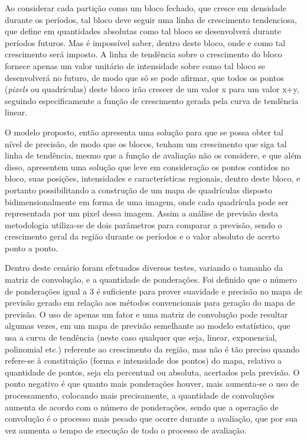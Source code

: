 Ao considerar cada partição como um bloco fechado, que cresce em densidade durante os períodos, tal bloco deve seguir uma linha de crescimento tendenciosa, que define em quantidades absolutas como tal bloco se desenvolverá durante períodos futuros. Mas é impossível saber, dentro deste bloco, onde e como tal crescimento será imposto. A linha de tendência sobre o crescimento do bloco fornece apenas um valor unitário de intensidade sobre como tal bloco se desenvolverá no futuro, de modo que só se pode afirmar, que todos os pontos (\emph{pixels} ou quadrículas) deste bloco irão crescer de um valor x para um valor x+y, seguindo especificamente a função de crescimento gerada pela curva de tendência linear. 

O modelo proposto, então apresenta uma solução para que se possa obter tal nível de precisão, de modo que os blocos, tenham um crescimento que siga tal linha de tendência, mesmo que a função de avaliação não os considere, e que além disso, apresentem uma solução que leve em consideração os pontos contidos no bloco, suas posições, intensidades e características regionais, dentro deste bloco, e portanto possibilitando a construção de um mapa de quadrículas disposto bidimensionalmente em forma de uma imagem, onde cada quadrícula pode ser representada por um pixel dessa imagem. Assim a análise de previsão desta metodologia utiliza-se de dois parâmetros para comparar a previsão, sendo o crescimento geral da região durante os períodos e o valor absoluto de acerto ponto a ponto.

Dentro deste cenário foram efetuados diversos testes, variando o tamanho da matriz de convolução, e a quantidade de ponderações. Foi definido que o número de ponderações igual a 3 é suficiente para prover suavidade e precisão no mapa de previsão gerado em relação aos métodos convencionais para geração do mapa de previsão. O uso de apenas um fator e uma matriz de convolução pode resultar algumas vezes, em um mapa de previsão semelhante ao modelo estatístico, que usa a curva de tendência (neste caso qualquer que seja, linear, exponencial, polinomial etc.) referente ao crescimento da região, mas não é tão preciso quando refere-se à constituição (forma e intensidade dos pontos) do mapa, relativo a quantidade de pontos, seja ela percentual ou absoluta, acertados pela previsão. O ponto negativo é que quanto mais ponderações houver, mais aumenta-se o uso de processamento, colocando mais precisamente, a quantidade de convoluções aumenta de acordo com o número de ponderações, sendo que a operação de convolução é o processo mais pesado que ocorre durante a avaliação, que por sua vez aumenta o tempo de execução de todo o processo de avaliação.

